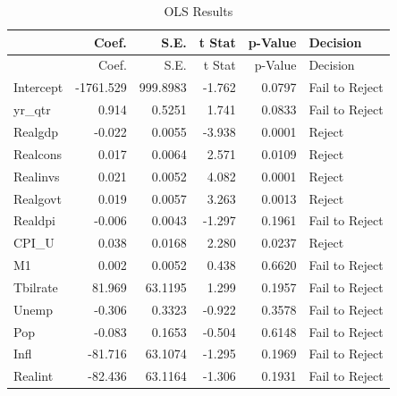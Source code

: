 \documentclass[11pt,]{article}
\newenvironment{Shaded}{\begin{snugshade}}{\end{snugshade}}
\newcommand{\KeywordTok}[1]{\textcolor[rgb]{0.13,0.29,0.53}{\textbf{#1}}}
\newcommand{\DataTypeTok}[1]{\textcolor[rgb]{0.13,0.29,0.53}{#1}}
\newcommand{\StringTok}[1]{\textcolor[rgb]{0.31,0.60,0.02}{#1}}
\newcommand{\CommentTok}[1]{\textcolor[rgb]{0.56,0.35,0.01}{\textit{#1}}}
\newcommand{\OperatorTok}[1]{\textcolor[rgb]{0.81,0.36,0.00}{\textbf{#1}}}
\newcommand{\NormalTok}[1]{#1}
\begin{document}
\begin{Shaded}
\end{Shaded}

\begin{longtable}[]{@{}lrrrrl@{}}
\caption{OLS Results}\tabularnewline
\toprule
& Coef. & S.E. & t Stat & p-Value & Decision\tabularnewline
\midrule
\endfirsthead
\toprule
& Coef. & S.E. & t Stat & p-Value & Decision\tabularnewline
\midrule
\endhead
Intercept & -1761.529 & 999.8983 & -1.762 & 0.0797 & Fail to
Reject\tabularnewline
yr\_qtr & 0.914 & 0.5251 & 1.741 & 0.0833 & Fail to
Reject\tabularnewline
Realgdp & -0.022 & 0.0055 & -3.938 & 0.0001 & Reject\tabularnewline
Realcons & 0.017 & 0.0064 & 2.571 & 0.0109 & Reject\tabularnewline
Realinvs & 0.021 & 0.0052 & 4.082 & 0.0001 & Reject\tabularnewline
Realgovt & 0.019 & 0.0057 & 3.263 & 0.0013 & Reject\tabularnewline
Realdpi & -0.006 & 0.0043 & -1.297 & 0.1961 & Fail to
Reject\tabularnewline
CPI\_U & 0.038 & 0.0168 & 2.280 & 0.0237 & Reject\tabularnewline
M1 & 0.002 & 0.0052 & 0.438 & 0.6620 & Fail to Reject\tabularnewline
Tbilrate & 81.969 & 63.1195 & 1.299 & 0.1957 & Fail to
Reject\tabularnewline
Unemp & -0.306 & 0.3323 & -0.922 & 0.3578 & Fail to
Reject\tabularnewline
Pop & -0.083 & 0.1653 & -0.504 & 0.6148 & Fail to Reject\tabularnewline
Infl & -81.716 & 63.1074 & -1.295 & 0.1969 & Fail to
Reject\tabularnewline
Realint & -82.436 & 63.1164 & -1.306 & 0.1931 & Fail to
Reject\tabularnewline
\bottomrule
\end{longtable}
\end{document}
